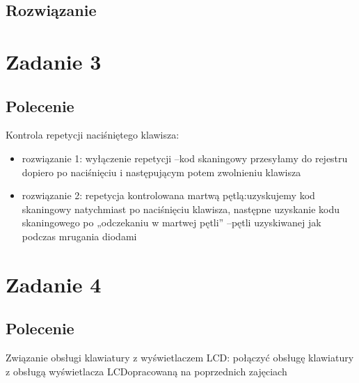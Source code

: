 \documentclass[a4paper,12pt]{extarticle}  %
\begin{document}
\subsection{Rozwiązanie}
% 
\section{Zadanie 3}
\subsection{Polecenie}
Kontrola repetycji naciśniętego klawisza:
\begin{itemize}
    \item rozwiązanie 1: wyłączenie repetycji –kod skaningowy przesyłamy do rejestru dopiero po naciśnięciu i następującym potem zwolnieniu klawisza
    \item rozwiązanie 2: repetycja kontrolowana martwą pętlą:uzyskujemy kod skaningowy natychmiast po naciśnięciu klawisza, następne uzyskanie kodu skaningowego po „odczekaniu w martwej pętli” –pętli uzyskiwanej jak podczas mrugania diodami
\end{itemize}
\section{Zadanie 4}
\subsection{Polecenie}
Związanie obsługi klawiatury z wyświetlaczem LCD: połączyć obsługę klawiatury z obsługą wyświetlacza LCDopracowaną na poprzednich zajęciach
\end{document}
